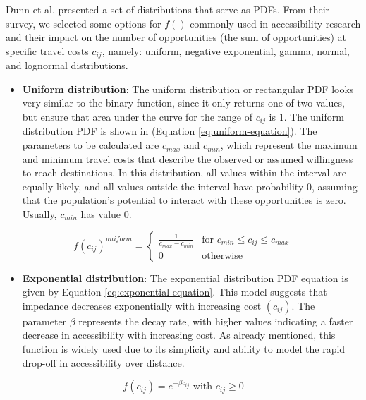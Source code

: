 \documentclass[preprint, 3p,
authoryear]{elsarticle} %
\providecommand{\tightlist}{%
  \setlength{\itemsep}{0pt}\setlength{\parskip}{0pt}}
\begin{document}
Dunn et al. \citeyearpar{dunn2023} presented a set of distributions that
serve as PDFs. From their survey, we selected some options for \(f()\)
commonly used in accessibility research and their impact on the number
of opportunities (the sum of opportunities) at specific travel costs
\(c_{ij}\), namely: uniform, negative exponential, gamma, normal, and
lognormal distributions.

\begin{itemize}
\tightlist
\item
  \textbf{Uniform distribution}: The uniform distribution or rectangular
  PDF looks very similar to the binary function, since it only returns
  one of two values, but ensure that area under the curve for the range
  of \(c_{ij}\) is 1. The uniform distribution PDF is shown in (Equation
  \ref{eq:uniform-equation}). The parameters to be calculated are
  \(c_{max}\) and \(c_{min}\), which represent the maximum and minimum
  travel costs that describe the observed or assumed willingness to
  reach destinations. In this distribution, all values within the
  interval are equally likely, and all values outside the interval have
  probability 0, assuming that the population's potential to interact
  with these opportunities is zero. Usually, \(c_{min}\) has value 0.
\end{itemize}

\begin{equation}
f(c_{ij})^{uniform} =
\begin{cases}
  \frac{1}{c_{max} - c_{min}} & \text{for } c_{min} \le c_{ij} \le c_{max} \\
  0 & \text{otherwise}
\end{cases}
\label{eq:uniform-equation}
\end{equation}

\begin{itemize}
\tightlist
\item
  \textbf{Exponential distribution}: The exponential distribution PDF
  equation is given by Equation \ref{eq:exponential-equation}. This
  model suggests that impedance decreases exponentially with increasing
  cost \((c_{ij})\). The parameter \(\beta\) represents the decay rate,
  with higher values indicating a faster decrease in accessibility with
  increasing cost. As already mentioned, this function is widely used
  due to its simplicity and ability to model the rapid drop-off in
  accessibility over distance.
\end{itemize}

\begin{equation}
f(c_{ij}) = e^{-\beta c_{ij}} \text{ with } c_{ij} \ge 0
\label{eq:exponential-equation}
\end{equation}
\end{document}
